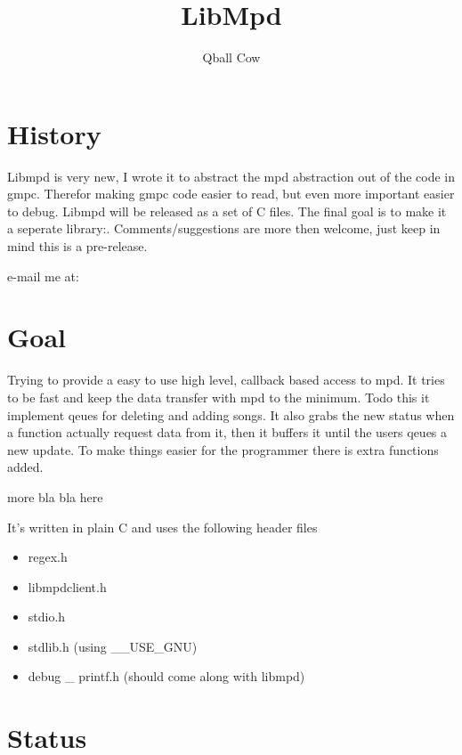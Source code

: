 \documentclass[a4paper,11pt]{article}
\begin{document}
 
 \title{LibMpd} 
 \author{Qball Cow}
 \maketitle
 
 \section{History}
 Libmpd is very new, I wrote it to abstract the mpd abstraction out of the code
 in gmpc. Therefor making gmpc code easier to read, but even more important
 easier to debug. Libmpd will be released as a set of C files. The final goal is
 to make it a seperate library:. Comments/suggestions are more then welcome,
 just keep in mind this is a pre-release.
 
 e-mail me at: 
 
 \section{Goal}
 
 Trying to provide a easy to use high level, callback based access to mpd. It
 tries to be fast and keep the data transfer with mpd to the minimum. 
	Todo this it implement qeues for deleting and adding songs. It also grabs the new status when a function actually request data from it, then it buffers it until the users qeues a new update. To make things easier for the programmer there is extra functions added.
	
	{\color{red} more bla bla here}
	
	It's written in plain C and uses the following header files
	\begin{itemize}
	  \item regex.h
	  
	  \item libmpdclient.h
	  
	  \item stdio.h
	  
	  \item stdlib.h (using  \_\_USE\_GNU)
	  
	  \item debug \_ printf.h (should come along with libmpd)
	\end{itemize}
	
	\section{Status}
	
\end{document}

